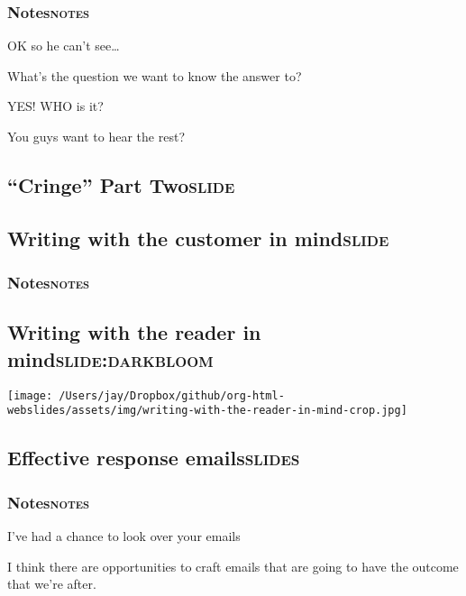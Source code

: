 \documentclass[11pt]{article}
\begin{document}
\subsubsection{Notes\hfill{}\textsc{notes}}
\label{sec:org50e41d5}
OK so he can't see\ldots{}

What's the question we want to know the answer to?

YES! WHO is it?

You guys want to hear the rest?

\subsection{``Cringe'' Part Two\hfill{}\textsc{slide}}
\label{sec:orga0fa5dc}

\subsection{Writing with the customer in mind\hfill{}\textsc{slide}}
\label{sec:orgef1a688}

\subsubsection{Notes\hfill{}\textsc{notes}}
\label{sec:org73f59e9}

\subsection{Writing with the reader in mind\hfill{}\textsc{slide:darkbloom}}
\label{sec:org48a30a5}
\begin{center}
\texttt{[image: /Users/jay/Dropbox/github/org-html-webslides/assets/img/writing-with-the-reader-in-mind-crop.jpg]}
\end{center}

\subsection{Effective response emails\hfill{}\textsc{slides}}
\label{sec:org126f5b3}

\subsubsection{Notes\hfill{}\textsc{notes}}
\label{sec:orge3fce13}
I've had a chance to look over your emails

I think there are opportunities to craft emails that are going to have the outcome that we're after.
\end{document}
